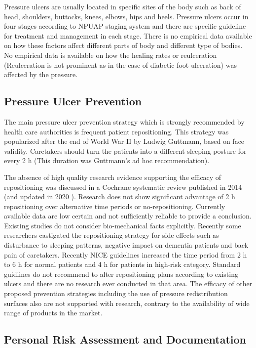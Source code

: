 Pressure ulcers are usually located in specific sites of the body such as back of head, shoulders, buttocks,  knees, elbows, hips and heels.  Pressure ulcers occur in four stages according to NPUAP staging system and there are specific guideline for treatment and management in each stage.\cite{npuapguide} There is no empirical data available on how these factors affect different parts of body and different type of bodies. No empirical data is available on how the healing rates or reulceration (Reulceration is not prominent as in the case of diabetic foot ulceration) was affected by the pressure. 

\subsection{Pressure Ulcer Prevention}
The main pressure ulcer prevention strategy which is strongly recommended by health care authorities is frequent patient repositioning. This strategy was popularized after the end of World War II by Ludwig Guttmann, based on face validity. \cite{biomechanics} Caretakers should turn the patients into a different sleeping posture for every 2 h (This duration was Guttmann's ad hoc recommendation).

The absence of high quality research evidence supporting the efficacy of repositioning was discussed in a Cochrane systematic review published in 2014  \cite{cochrane14} (and updated in 2020  \cite{cochrane20}). Research does not show significant advantage of 2 h repositioning over alternative time periods or no-repositioning. Currently available data are low certain and not sufficiently reliable to provide a conclusion. Existing studies do not consider bio-mechanical facts explicitly. Recently some researchers castigated the repositioning strategy for side effects such as disturbance to sleeping patterns, negative impact on dementia patients and back pain of caretakers.\cite{elderabuse} Recently NICE guidelines increased the time period from 2 h to 6 h for normal patients and 4 h for patients in high-risk category. \cite{sara} Standard guidlines do not recommend to alter repositioning plans according to existing ulcers and there are no research ever conducted in that area. The efficacy of other proposed prevention strategies including the use of pressure redistribution surfaces also are not supported with research, contrary to the availability of wide range of products in the market. \cite{cochranesupport}

\subsection{Personal Risk Assessment and Documentation}

